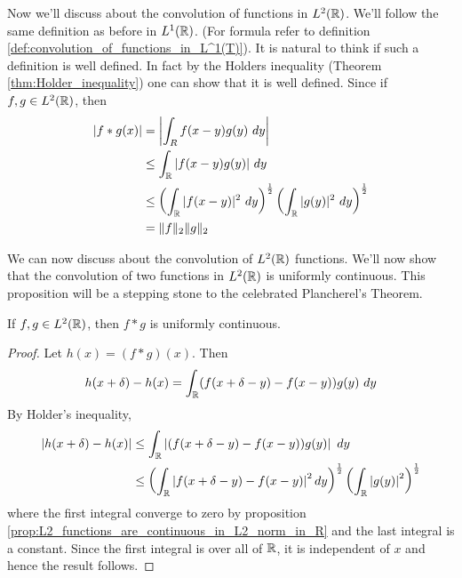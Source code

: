 Now we'll discuss about the convolution of functions in $L^2(\mathbb R)$. We'll follow the same definition as before in $L^1(\mathbb R)$. (For formula refer to definition \ref{def:convolution_of_functions_in_L^1(T)}). It is natural to think if such a definition is well defined. In fact by the Holders inequality (Theorem \ref{thm:Holder_inequality}) one can show that it is well defined. Since if $f, g \in L^2(\mathbb R)$, then 
  \begin{align*}
    |f*g(x)| &= \left|\int_R f(x-y)g(y) \ dy \right|\\
        &\le \int_\mathbb R |f(x-y)g(y)| \ dy \\
        &\le \left(\int_\mathbb R |f(x-y)|^2 \ dy \right)^{\frac{1}{2}} \left(\int_\mathbb R |g(y)|^2 \ dy \right)^{\frac{1}{2}} \\
        &= \|f\|_2 \|g\|_2
  \end{align*}

We can now discuss about the convolution of $L^2(\mathbb R)$ functions. We'll now show that the convolution of two functions in $L^2(\mathbb R)$ is uniformly continuous. This proposition will be a stepping stone to the celebrated Plancherel's Theorem.

  \begin{proposition}
    If $f, g \in L^2(\mathbb R)$, then $f*g$ is uniformly continuous.
  \end{proposition}
  \begin{proof}
    Let $h(x) = (f*g)(x)$. Then $$h(x+\delta) - h(x) = \int_\mathbb R (f(x+\delta - y) - f(x-y)) g(y) \ dy$$
    By Holder's inequality, 
    \begin{align*}
      |h(x+\delta) - h(x)| &\le \int_\mathbb R \left|(f(x+\delta - y) - f(x-y)) g(y) \right| \ dy \\
      &\le \left( \int_\mathbb R \left|f(x+\delta - y) - f(x-y) \right|^2 dy\right)^{\frac{1}{2}} \left( \int_\mathbb R \left|g(y)\right|^2 \right)^{\frac{1}{2}}
    \end{align*}
    where the first integral converge to zero by proposition \ref{prop:L2_functions_are_continuous_in_L2_norm_in_R} and the last integral is a constant. Since the first integral is over all of $\mathbb R$, it is independent of $x$ and hence the result follows.
  \end{proof}

